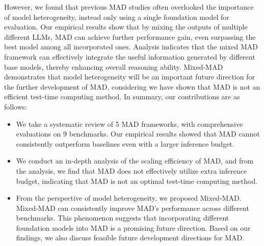 However, we found that previous MAD studies often overlooked the importance of model heterogeneity, instead only using a single foundation model for evaluation. Our empirical results show that by mixing the outputs of multiple different LLMs, MAD can achieve further performance gain, even surpassing the best model among all incorporated ones. Analysis indicates that the mixed MAD framework can effectively integrate the useful information generated by different base models, thereby enhancing overall reasoning ability. Mixed-MAD demonstrates that model heterogeneity will be an important future direction for the further development of MAD, considering we have shown that MAD is not an efficient test-time computing method. In summary, our contributions are as follows:

\begin{itemize}
    \item We take a systematic review of 5 MAD frameworks, with comprehensive evaluations on 9 benchmarks. Our empirical results showed that MAD cannot consistently outperform baselines even with a larger inference budget.

    \item We conduct an in-depth analysis of the scaling efficiency of MAD, and from the analysis, we find that MAD does not effectively utilize extra inference budget, indicating that MAD is not an optimal test-time computing method.

    \item From the perspective of model heterogeneity, we proposed Mixed-MAD. Mixed-MAD can consistently improve MAD's performance across different benchmarks. This phenomenon suggests that incorporating different foundation models into MAD is a promising future direction. Based on our findings, we also discuss feasible future development directions for MAD.
\end{itemize}





